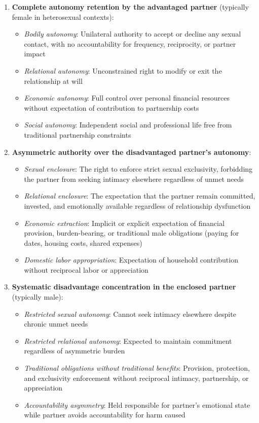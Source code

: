 \documentclass[12pt, letterpaper]{article}
\begin{document}
\begin{enumerate}
    \item \textbf{Complete autonomy retention by the advantaged partner} (typically female in heterosexual contexts):
    \begin{itemize}
        \item \textit{Bodily autonomy}: Unilateral authority to accept or decline any sexual contact, with no accountability for frequency, reciprocity, or partner impact
        \item \textit{Relational autonomy}: Unconstrained right to modify or exit the relationship at will
        \item \textit{Economic autonomy}: Full control over personal financial resources without expectation of contribution to partnership costs
        \item \textit{Social autonomy}: Independent social and professional life free from traditional partnership constraints
    \end{itemize}
    
    \item \textbf{Asymmetric authority over the disadvantaged partner's autonomy}:
    \begin{itemize}
        \item \textit{Sexual enclosure}: The right to enforce strict sexual exclusivity, forbidding the partner from seeking intimacy elsewhere regardless of unmet needs
        \item \textit{Relational enclosure}: The expectation that the partner remain committed, invested, and emotionally available regardless of relationship dysfunction
        \item \textit{Economic extraction}: Implicit or explicit expectation of financial provision, burden-bearing, or traditional male obligations (paying for dates, housing costs, shared expenses)
        \item \textit{Domestic labor appropriation}: Expectation of household contribution without reciprocal labor or appreciation
    \end{itemize}
    
    \item \textbf{Systematic disadvantage concentration in the enclosed partner} (typically male):
    \begin{itemize}
        \item \textit{Restricted sexual autonomy}: Cannot seek intimacy elsewhere despite chronic unmet needs
        \item \textit{Restricted relational autonomy}: Expected to maintain commitment regardless of asymmetric burden
        \item \textit{Traditional obligations without traditional benefits}: Provision, protection, and exclusivity enforcement without reciprocal intimacy, partnership, or appreciation
        \item \textit{Accountability asymmetry}: Held responsible for partner's emotional state while partner avoids accountability for harm caused
    \end{itemize}
\end{enumerate}
\end{document}
